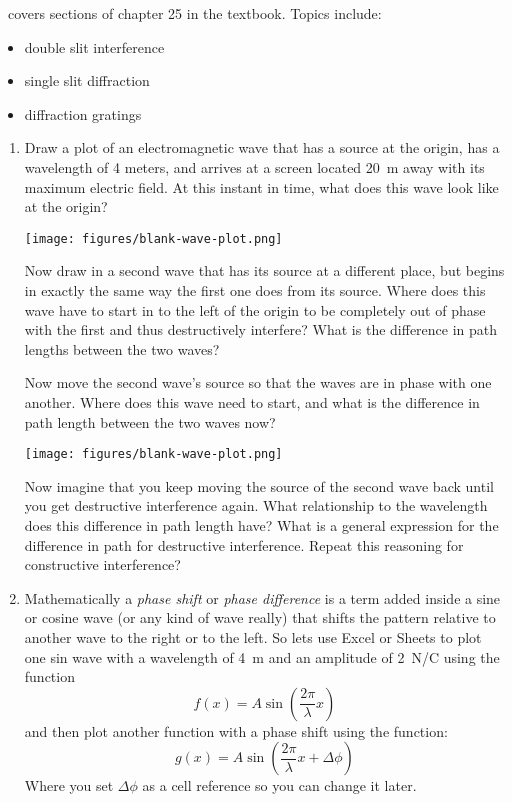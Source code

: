 \week \ covers sections of chapter 25 in the textbook. Topics include:

\begin{itemize}
	\item double slit interference
	\item single slit diffraction
	\item diffraction gratings
\end{itemize}

\begin{enumerate}
\setlength\itemsep{2 in}

\item
Draw a plot of an electromagnetic wave that has a source at the origin, has a wavelength of 4 meters, and arrives at a screen located \SI{20}{m} away with its maximum electric field. At this instant in time, what does this wave look like at the origin?

\texttt{[image: figures/blank-wave-plot.png]}

Now draw in a second wave that has its source at a different place, but begins in exactly the same way the first one does from its source. Where does this wave have to start in to the left of the origin to be completely out of phase with the first and thus destructively interfere? What is the difference in path lengths between the two waves?

Now move the second wave's source so that the waves are in phase with one another. Where does this wave need to start, and what is the difference in path length between the two waves now?

\texttt{[image: figures/blank-wave-plot.png]}

Now imagine that you keep moving the source of the second wave back until you get destructive interference again. What relationship to the wavelength does this difference in path length have? What is a general expression for the difference in path for destructive interference. Repeat this reasoning for constructive interference?
 
\item
Mathematically a \emph{phase shift} or \emph{phase difference} is a term added inside a sine or cosine wave (or any kind of wave really) that shifts the pattern relative to another wave to the right or to the left. So lets use Excel or Sheets to plot one sin wave with a wavelength of \SI{4}{m} and an amplitude of \SI{2}{\newton/\coulomb} using the function
\[f(x) = A \sin\left(\frac{2\pi}{\lambda}x\right)\]
and then plot another function with a phase shift using the function:
\[g(x) = A \sin\left(\frac{2\pi}{\lambda}x+\Delta\phi\right)\] 
Where you set $\Delta\phi$ as a cell reference so you can change it later. 


\end{enumerate}
